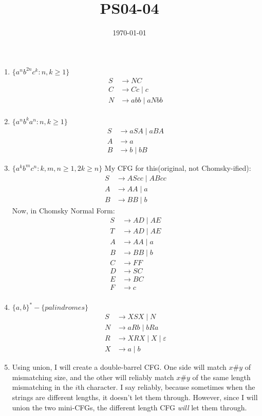 \documentclass{article}
\title{PS04-04}
\date{\today}
\begin{document}
\maketitle

\begin{enumerate}[label=\alph*.]
	\item $\{a^nb^{2n}c^k : n,k \geq 1\}$
	\begin{align*}
	S &\rightarrow NC\\
	C &\rightarrow Cc \mid c\\
	N &\rightarrow abb \mid aNbb\\
	\end{align*}
	\item $\{a^nb^ka^n : n,k \geq 1\}$
	\begin{align*}
	S &\rightarrow aSA \mid aBA\\
	A &\rightarrow a\\
	B &\rightarrow b \mid bB
	\end{align*}
	\item $\{a^kb^mc^n:k,m,n \geq 1,2k \geq n\}$
	My CFG for this(original, not Chomsky-ified):
	\begin{align*}
	S &\rightarrow AScc \mid ABcc\\
	A &\rightarrow AA \mid a\\
	B &\rightarrow BB \mid b
	\end{align*}
	Now, in Chomsky Normal Form:
	\begin{align*}
	S &\rightarrow AD \mid AE\\
	T &\rightarrow AD \mid AE\\
	A &\rightarrow AA \mid a\\
	B &\rightarrow BB \mid b\\
	C &\rightarrow FF\\
	D &\rightarrow SC\\
	E &\rightarrow BC\\
	F &\rightarrow c\\
	\end{align*}
	\item $\{a,b\}^*-\{palindromes\}$
	\begin{align*}
	S &\rightarrow XSX \mid N\\
	N &\rightarrow aRb \mid bRa\\
	R &\rightarrow XRX \mid X \mid \varepsilon\\
	X &\rightarrow a\mid b
	\end{align*}
	\item Using union, I will create a double-barrel CFG. One side will match $x\#y$ of mismatching size, and the other will reliably match $x\#y$ of the same length mismatching in the $i$th character. I say reliably, because sometimes when the strings are different lengths, it doesn't let them through. However, since I will union the two mini-CFGs, the different length CFG \textit{will} let them through.\\

\end{enumerate}
\end{document}
